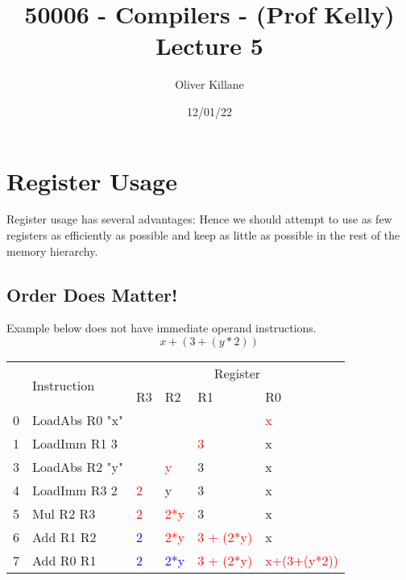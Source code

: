 \documentclass{report}
\title{50006 - Compilers - (Prof Kelly) Lecture 5}
\author{Oliver Killane}
\date{12/01/22}
\newcommand{\hot}[1]{\textcolor{red}{#1}}
\newcommand{\old}[1]{\textcolor{blue}{#1}}
\begin{document}
    \maketitle
    
    \section*{Register Usage}
        Register usage has several advantages:
        Hence we should attempt to use as few registers as efficiently as possible and keep as little as possible in the rest of the memory hierarchy.

        \subsection*{Order Does Matter!}
            Example below does not have immediate operand instructions.
            \[x + (3 + (y * 2))\]
            \begin{center}
                \begin{tabular}{c l | l l l l}
                    & \multirow{2}{*}{Instruction} & \multicolumn{4}{c}{Register} \\
                    & & R3 & R2 & R1 & R0 \\
                    \hline
                    0 &LoadAbs R0 "x" &        &          &               &          \hot{x}\\
                    1 &LoadImm R1 3   &        &          &        \hot{3}&                x\\
                    3 &LoadAbs R2 "y" &        &   \hot{y}&              3&                x\\
                    4 &LoadImm R3 2   & \hot{2}&         y&              3&                x\\
                    5 &Mul R2 R3      & \hot{2}& \hot{2*y}&              3&                x\\
                    6 &Add R1 R2      & \old{2}& \hot{2*y}&\hot{3 + (2*y)}&                x\\
                    7 &Add R0 R1      & \old{2}& \old{2*y}&\hot{3 + (2*y)}&\hot{x+(3+(y*2))}\\
                \end{tabular}
            \end{center}
\end{document}
